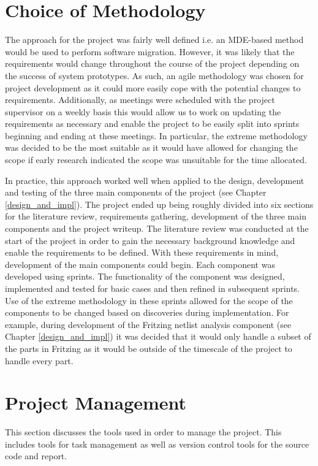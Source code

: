 \documentclass{UoYCSproject}
\begin{document}
\section{Choice of Methodology} \label{choice_meth}
The approach for the project was fairly well defined i.e. an MDE-based method would be used to perform software migration. However, it was likely that the requirements would change throughout the course of the project depending on the success of system prototypes. As such, an agile methodology was chosen for project development as it could more easily cope with the potential changes to requirements. Additionally, as meetings were scheduled with the project supervisor on a weekly basis this would allow us to work on updating the requirements as necessary and enable the project to be easily split into sprints beginning and ending at these meetings. In particular, the extreme methodology was decided to be the most suitable as it would have allowed for changing the scope if early research indicated the scope was unsuitable for the time allocated.

In practice, this approach worked well when applied to the design, development and testing of the three main components of the project (see Chapter \ref{design_and_impl}). The project ended up being roughly divided into six sections for the literature review, requirements gathering, development of the three main components and the project writeup. The literature review was conducted at the start of the project in order to gain the necessary background knowledge and enable the requirements to be defined. With these requirements in mind, development of the main components could begin. Each component was developed using sprints. The functionality of the component was designed, implemented and tested for basic cases and then refined in subsequent sprints. Use of the extreme methodology in these sprints allowed for the scope of the components to be changed based on discoveries during implementation. For example, during development of the Fritzing netlist analysis component (see Chapter \ref{design_and_impl}) it was decided that it would only handle a subset of the parts in Fritzing as it would be outside of the timescale of the project to handle every part.

\section{Project Management} \label{proj_mgmt}
This section discusses the tools used in order to manage the project. This includes tools for task management as well as version control tools for the source code and report.
\end{document}
